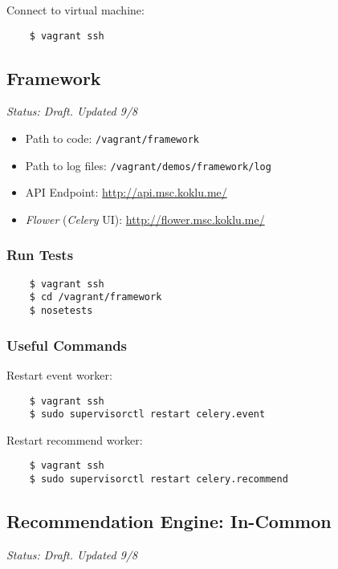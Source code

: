 Connect to virtual machine:

\begin{verbatim}
    $ vagrant ssh
\end{verbatim}


\subsection{Framework}

\emph{Status: Draft. Updated 9/8}

\begin{itemize}
\item Path to code: \texttt{/vagrant/framework}
\item Path to log files: \texttt{/vagrant/demos/framework/log}
\item API Endpoint: \url{http://api.msc.koklu.me/}
\item \emph{Flower} (\emph{Celery} UI): \url{http://flower.msc.koklu.me/}
\end{itemize}

\subsubsection{Run Tests}

\begin{verbatim}
    $ vagrant ssh
    $ cd /vagrant/framework
    $ nosetests
\end{verbatim}

\subsubsection{Useful Commands}

Restart event worker:

\begin{verbatim}
    $ vagrant ssh
    $ sudo supervisorctl restart celery.event
\end{verbatim}

Restart recommend worker:

\begin{verbatim}
    $ vagrant ssh
    $ sudo supervisorctl restart celery.recommend
\end{verbatim}


\subsection{Recommendation Engine: In-Common}

\emph{Status: Draft. Updated 9/8}

